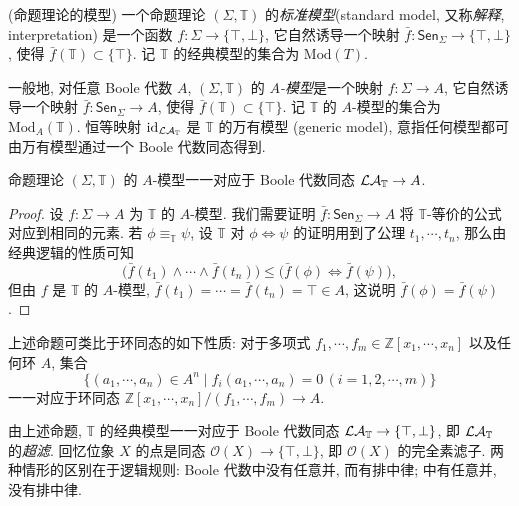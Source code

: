 \begin{definition}
	{(命题理论的模型)}
	一个命题理论 $(\Sigma,\mathbb T)$ 的\emph{标准模型}\footnotemark (standard model, 又称\emph{解释}, interpretation) 是一个函数 $f\colon \Sigma \to \{\top,\bot\}$, 它自然诱导一个映射 $\bar f\colon \mathsf {Sen}_\Sigma\to\{\top,\bot\}$, 使得 $\bar f(\mathbb T)\subset \{\top\}$. 记 $\mathbb T$ 的经典模型的集合为 $\text{Mod}(T)$.
	
	一般地, 对任意 Boole 代数 $A$, $(\Sigma,\mathbb T)$ 的 \emph{$A$-模型}是一个映射 $f\colon \Sigma \to A$, 它自然诱导一个映射 $\bar f\colon \mathsf {Sen}_\Sigma\to A$, 使得 $\bar f(\mathbb T)\subset \{\top\}$. 记 $\mathbb T$ 的 $A$-模型的集合为 $\text{Mod}_A(\mathbb T)$. 恒等映射 $\operatorname{id}_{\mathcal {LA}_{\mathbb T}}$ 是 $\mathbb T$ 的万有模型 (generic model), 意指任何模型都可由万有模型通过一个 Boole 代数同态得到.
\end{definition}


\begin{prop}
	[label={model-boolealg-homomorphism}]
	{}
	命题理论 $(\Sigma,\mathbb T)$ 的 $A$-模型一一对应于 Boole 代数同态 $\mathcal {LA}_{\mathbb T} \to A$.
\end{prop}

\begin{proof}
	设 $f\colon \Sigma\to A$ 为 $\mathbb T$ 的 $A$-模型. 我们需要证明 $\bar f\colon \mathsf {Sen}_\Sigma\to A$ 将 $\mathbb T$-等价的公式对应到相同的元素. 若 $\phi \equiv_{\mathbb T} \psi$, 设 $\mathbb T$ 对 $\phi \Leftrightarrow\psi$ 的证明用到了公理 $t_1,\cdots,t_n$, 那么由经典逻辑的性质可知
	$$
	\big( \bar f(t_1) \land \cdots \land \bar f (t_n) \big) \leq \big( \bar f(\phi) \Leftrightarrow \bar f(\psi) \big),
	$$
	但由 $f$ 是 $\mathbb T$ 的 $A$-模型, $\bar f(t_1)=\cdots = \bar f(t_n) = \top\in A$, 这说明 $\bar f(\phi) = \bar f(\psi)$.
\end{proof}

\begin{remark}
	{}
	上述命题可类比于环同态的如下性质:
	对于多项式 $f_1,\cdots,f_m\in \mathbb{Z}[x_1,\cdots,x_n]$ 以及任何环 $A$, 集合
	$$
	\big\{
	(a_1,\cdots,a_n)\in A^n\mid f_i(a_1,\cdots,a_n)=0\,(i=1,2,\cdots,m)
	\big\}
	$$
	一一对应于环同态 $\mathbb{Z}[x_1,\cdots,x_n]/(f_1,\cdots,f_m) \to A$.
\end{remark}

\begin{remark}
	[label={model-and-ultrafilter}]
	{}
	由上述命题, $\mathbb T$ 的经典模型一一对应于 Boole 代数同态 $\mathcal {LA}_{\mathbb T} \to \{\top,\bot\}$, 即 $\mathcal {LA}_{\mathbb T}$ 的\emph{超滤}.
	回忆位象 $X$ 的点是\fm{}同态 $\mathcal O(X) \to \{\top,\bot\}$, 即 $\mathcal O(X)$ 的完全素滤子. 两种情形的区别在于逻辑规则: Boole 代数中没有任意并, 而有排中律; \fm{}中有任意并, 没有排中律.
\end{remark}

